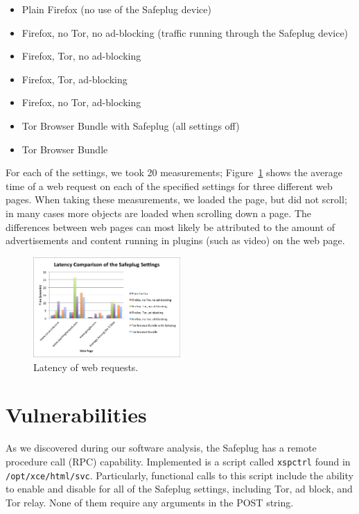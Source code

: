 \documentclass[letterpaper,twocolumn,10pt]{article}
\begin{document}
\begin{itemize} %
\item Plain Firefox (no use of the Safeplug device)
\item Firefox, no Tor, no ad-blocking (traffic running through the Safeplug device)
\item Firefox, Tor, no ad-blocking
\item Firefox, Tor, ad-blocking
\item Firefox, no Tor, ad-blocking
\item Tor Browser Bundle with Safeplug (all settings off)
\item Tor Browser Bundle
\end{itemize}

For each of the settings, we took 20 measurements; Figure~\ref{fig:latency2} shows the average time of a web request on each of the specified settings for three different web pages.  When taking these measurements, we loaded the page, but did not scroll; in many cases more objects are loaded when scrolling down a page.  The differences between web pages can most likely be attributed to the amount of advertisements and content running in plugins (such as video) on the web page.  

\begin{figure}
  \centering
  \includegraphics[width=0.5\textwidth]{latencygraph}
  \caption{Latency of web requests.}
  \label{fig:latency2}
\end{figure}

\section{Vulnerabilities}
As we discovered during our software analysis, the Safeplug has a remote procedure call (RPC) capability.  Implemented is a script called \verb!xspctrl! found in \verb!/opt/xce/html/svc!.  Particularly, functional calls to this script include the ability to enable and disable for all of the Safeplug settings, including Tor, ad block, and Tor relay.  None of them require any arguments in the POST string.
\end{document}
